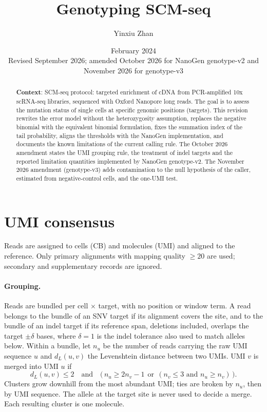 \documentclass[11pt]{article}
\title{Genotyping SCM-seq}
\author{Yinxiu Zhan}
\date{February 2024 \\ \small Revised September 2026; amended October 2026 for NanoGen genotype-v2 and November 2026 for genotype-v3}
\begin{document}
\maketitle

\begin{abstract}
\noindent\textbf{Context}: SCM-seq protocol: targeted enrichment of cDNA from PCR-amplified 10x scRNA-seq libraries, sequenced with Oxford Nanopore long reads. The goal is to assess the mutation status of single cells at specific genomic positions (targets). This revision rewrites the error model without the heterozygosity assumption, replaces the negative binomial with the equivalent binomial formulation, fixes the summation index of the tail probability, aligns the thresholds with the NanoGen implementation, and documents the known limitations of the current calling rule. The October 2026 amendment states the UMI grouping rule, the treatment of indel targets and the reported limitation quantities implemented by NanoGen genotype-v2. The November 2026 amendment (genotype-v3) adds contamination to the null hypothesis of the caller, estimated from negative-control cells, and the one-UMI test.
\end{abstract}

\section{UMI consensus}

Reads are assigned to cells (CB) and molecules (UMI) and aligned to the reference. Only primary alignments with mapping quality $\geq 20$ are used; secondary and supplementary records are ignored.

\paragraph{Grouping.} Reads are bundled per cell $\times$ target, with no position or window term. A read belongs to the bundle of an SNV target if its alignment covers the site, and to the bundle of an indel target if its reference span, deletions included, overlaps the target $\pm \delta$ bases, where $\delta=1$ is the indel tolerance also used to match alleles below. Within a bundle, let $n_u$ be the number of reads carrying the raw UMI sequence $u$ and $d_L(u,v)$ the Levenshtein distance between two UMIs. UMI $v$ is merged into UMI $u$ if
\begin{equation*}
d_L(u,v) \leq 2 \quad\text{and}\quad \bigl(\, n_u \geq 2n_v - 1 \ \ \text{or}\ \ (n_v \leq 3 \text{ and } n_u \geq n_v) \,\bigr).
\end{equation*}
Clusters grow downhill from the most abundant UMI; ties are broken by $n_u$, then by UMI sequence. The allele at the target site is never used to decide a merge. Each resulting cluster is one molecule.
\end{document}
